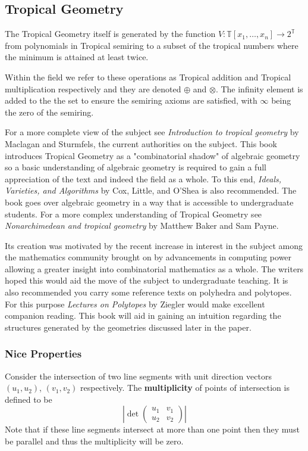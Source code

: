 \documentclass[12pt,a4paper]{amsart}
\newcommand{\T}{\mathbb{T}}
\theoremstyle{definition}
\theoremstyle{remark}
\begin{document}
\subsection{Tropical Geometry}

The Tropical Geometry itself is generated by the function $V:\T[x_1,\dots,x_n]\to 2^\T$ from polynomials in Tropical semiring to a subset of the tropical numbers where the minimum is attained at least twice.

Within the field we refer to these operations as Tropical addition and Tropical multiplication respectively and they are denoted $\oplus$ and $\otimes$.
The infinity element is added to the the set to ensure the semiring axioms are satisfied, with $\infty$ being the zero of the semiring. 

For a more complete view of the subject see \textit{Introduction to tropical geometry}\cite{MaclaganDiane1974-author2015Ittg} by Maclagan and Sturmfels, the current authorities on the subject.
This book introduces Tropical Geometry as a "combinatorial shadow" of algebraic geometry so a basic understanding of algebraic geometry is required to gain  a full appreciation of the text and indeed the field as a whole.
To this end, \textit{Ideals, Varieties, and Algorithms}\cite{CoxDavid2007IVaA} by Cox, Little, and O’Shea is also recommended. The book goes over algebraic geometry in a way that is accessible to undergraduate students.
For a more complex understanding of Tropical Geometry see \textit{Nonarchimedean and tropical geometry}\cite{baker2016nonarchimedean} by Matthew Baker and Sam Payne.

Its creation was motivated by the recent increase in interest in the subject among the mathematics community brought on by advancements in computing power allowing a greater insight into combinatorial mathematics as a whole. The writers hoped this would aid the move of the subject to undergraduate teaching.
It is also recommended you carry some reference texts on polyhedra and polytopes.
For this purpose \textit{Lectures on Polytopes}\cite{ZieglerGunterM1995Lop} by Ziegler would make excellent companion reading. This book will aid in gaining an intuition regarding the structures generated by the geometries discussed later in the paper.

\subsubsection{Nice Properties}

Consider the intersection of two line segments with unit direction vectors $(u_1,u_2)$, $(v_1,v_2)$ respectively.
The \textbf{multiplicity} of points of intersection is defined to be
\begin{equation}
    \left|\det
    \begin{pmatrix}
        u_1 & v_1\\
        u_2 & v_2
    \end{pmatrix}
    \right|
\end{equation}
Note that if these line segments intersect at more than one point then they must be parallel and thus the multiplicity will be zero.
\end{document}

